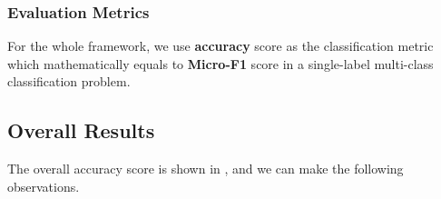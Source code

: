 \subsubsection{Evaluation Metrics}
For the whole framework, we use \textbf{accuracy} score as the classification metric
which mathematically equals to \textbf{Micro-F1} score in a single-label multi-class classification problem.

\subsection{Overall Results}
\label{sec:all res}
The overall accuracy score is shown in , and we can make the following observations.

